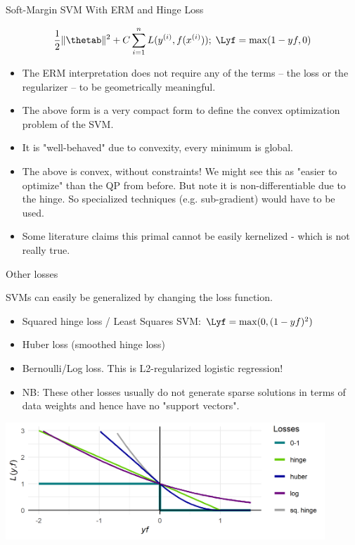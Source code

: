 \begin{vbframe}{Soft-Margin SVM With ERM and Hinge Loss}
\framebreak

  $$ \frac{1}{2} \|\thetab\|^2 + C \sumin \Lxyi ;\; \Lyf = \max(1-yf, 0)$$
\begin{itemize}
 \item  The ERM interpretation does not require any of the terms -- the loss or the regularizer -- to be geometrically meaningful.
  \item The above form is a very compact form to define the convex optimization problem of the SVM. 
  \item It is "well-behaved" due to convexity, every minimum is global.
  \item The above is convex, without constraints! We might see this as "easier to optimize" than the QP from before. But note it is non-differentiable due to the hinge. 
    So specialized techniques (e.g. sub-gradient) would have to be used. 
  \item Some literature claims this primal cannot be easily kernelized - which is not really true.
  \end{itemize}
\end{vbframe}

\begin{vbframe}{Other losses}

  SVMs can easily be generalized by changing the loss function.
  \begin{itemize}
    \item Squared hinge loss / Least Squares SVM: $\Lyf = \max(0, (1 - yf)^2)$ 
    \item Huber loss (smoothed hinge loss)
    \item Bernoulli/Log loss. This is L2-regularized logistic regression!
    \item NB: These other losses usually do not generate sparse solutions in terms of 
      data weights and hence have no "support vectors".
  \end{itemize}


\begin{center}
\includegraphics[width = 0.9\textwidth]{figure/other_losses.png} \\
\end{center}


\end{vbframe}


\endlecture



